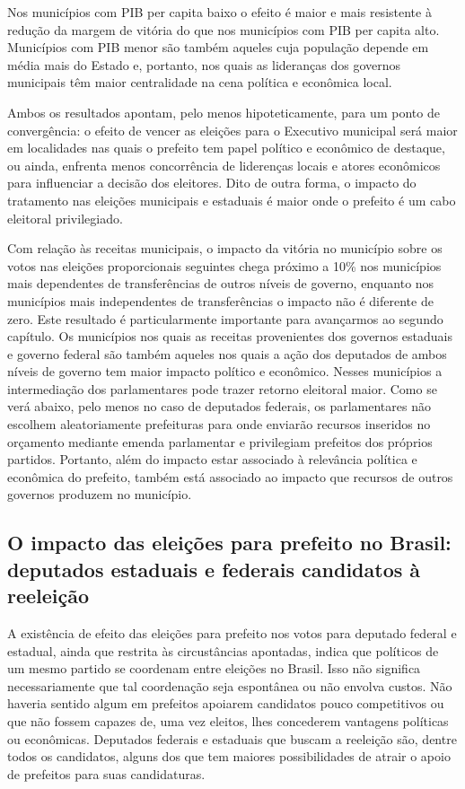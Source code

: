 Nos municípios com PIB per capita baixo o efeito é maior e mais resistente à redução da margem de vitória do que nos municípios com PIB per capita alto. Municípios com PIB menor são também aqueles cuja população depende em média mais do Estado e, portanto, nos quais as lideranças dos governos municipais têm maior centralidade na cena política e econômica local.

Ambos os resultados apontam, pelo menos hipoteticamente, para um ponto de convergência: o efeito de vencer as eleições para o Executivo municipal será maior em localidades nas quais o prefeito tem papel político e econômico de destaque, ou ainda, enfrenta menos concorrência de liderenças locais e atores econômicos para influenciar a decisão dos eleitores. Dito de outra forma, o impacto do tratamento nas eleições municipais e estaduais é maior onde o prefeito é um cabo eleitoral privilegiado.

Com relação às receitas municipais, o impacto da vitória no município sobre os votos nas eleições proporcionais seguintes chega próximo a 10\% nos municípios mais dependentes de transferências de outros níveis de governo, enquanto nos municípios mais independentes de transferências o impacto não é diferente de zero. Este resultado é particularmente importante para avançarmos ao segundo capítulo. Os municípios nos quais as receitas provenientes dos governos estaduais e governo federal são também aqueles nos quais a ação dos deputados de ambos níveis de governo tem maior impacto político e econômico. Nesses municípios a intermediação dos parlamentares pode trazer retorno eleitoral maior. Como se verá abaixo, pelo menos no caso de deputados federais, os parlamentares não escolhem aleatoriamente prefeituras para onde enviarão recursos inseridos no orçamento mediante emenda parlamentar e privilegiam prefeitos dos próprios partidos. Portanto, além do impacto estar associado à relevância política e econômica do prefeito, também está associado ao impacto que recursos de outros governos produzem no município.

\subsection{O impacto das eleições para prefeito no Brasil: deputados estaduais e federais candidatos à reeleição}

A existência de efeito das eleições para prefeito nos votos para deputado federal e estadual, ainda que restrita às circustâncias apontadas, indica que políticos de um mesmo partido se coordenam entre eleições no Brasil. Isso não significa necessariamente que tal coordenação seja espontânea ou não envolva custos. Não haveria sentido algum em prefeitos apoiarem candidatos pouco competitivos ou que não fossem capazes de, uma vez eleitos, lhes concederem vantagens políticas ou econômicas. Deputados federais e estaduais que buscam a reeleição são, dentre todos os candidatos, alguns dos que tem maiores possibilidades de atrair o apoio de prefeitos para suas candidaturas.

